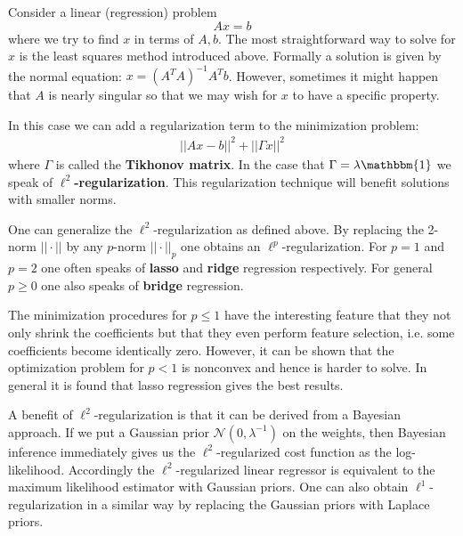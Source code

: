 
    \begin{method}{
        Consider a linear (regression) problem \[Ax = b\] where we try to find $x$ in terms of $A, b$. The most straightforward way to solve for $x$ is the least squares method introduced above. Formally a solution is given by the normal equation: $x=(A^TA)^{-1}A^Tb$. However, sometimes it might happen that $A$ is nearly singular so that we may wish for $x$ to have a specific property.

        In this case we can add a regularization term to the minimization problem:
        \begin{gather}
            ||Ax-b||^2+||\Gamma x||^2
        \end{gather}
        where $\Gamma$ is called the \textbf{Tikhonov matrix}. In the case that $\Gamma=\lambda\mathbbm{1}$ we speak of \textbf{$\ell^2$-regularization}. This regularization technique will benefit solutions with smaller norms.
    }
    \end{method}
    \begin{remark}
        One can generalize the $\ell^2$-regularization as defined above. By replacing the 2-norm $||\cdot||$ by any $p$-norm $||\cdot||_p$ one obtains an $\ell^p$-regularization. For $p=1$ and $p=2$ one often speaks of \textbf{lasso} and \textbf{ridge} regression respectively. For general $p\geq0$ one also speaks of \textbf{bridge} regression.

        The minimization procedures for $p\leq1$ have the interesting feature that they not only shrink the coefficients but that they even perform feature selection, i.e. some coefficients become identically zero. However, it can be shown that the optimization problem for $p<1$ is nonconvex and hence is harder to solve. In general it is found that lasso regression gives the best results.

        A benefit of $\ell^2$-regularization is that it can be derived from a Bayesian approach. If we put a Gaussian prior $\mathcal{N}(0, \lambda^{-1})$ on the weights, then Bayesian inference immediately gives us the $\ell^2$-regularized cost function as the log-likelihood. Accordingly the $\ell^2$-regularized linear regressor is equivalent to the maximum likelihood estimator with Gaussian priors. One can also obtain $\ell^1$-regularization in a similar way by replacing the Gaussian priors with Laplace priors.
    \end{remark}

